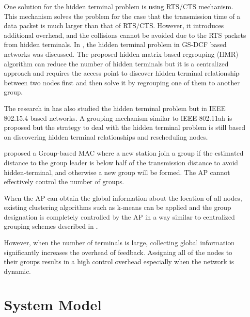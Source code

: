 One solution for the hidden terminal problem is using RTS/CTS mechanism. This mechanism solves the problem for the case that the transmission time of a data packet is much larger than that of RTS/CTS. However, it introduces additional overhead, and the collisions cannot be avoided due to the RTS packets from hidden terminals. In \cite{yoonregrouping}, the hidden terminal problem in GS-DCF based networks was discussed. The proposed hidden matrix based regrouping (HMR) algorithm can reduce the number of hidden terminals but it is a centralized approach and requires the access point to discover hidden terminal relationship between two nodes first and then solve it by regrouping one of them to another group.

The research in \cite{tseng2014effective} has also studied the hidden terminal problem but in IEEE 802.15.4-based networks. A grouping mechanism similar to IEEE 802.11ah is proposed but the strategy to deal with the hidden terminal problem is still based on discovering hidden terminal relationships and rescheduling nodes.

\cite{abichar2013group} proposed a Group-based MAC where a new station join a group if the estimated distance to the group leader is below half of the transmission distance to avoid hidden-terminal, and otherwise a new group will be formed. The AP cannot effectively control the number of groups.

When the AP can obtain the global information about the location of all nodes, existing clustering algorithms such as k-means can be applied and the group designation is completely controlled by the AP in a way similar to centralized grouping schemes described in \cite{zheng2014performance}.

However, when the number of terminals is large, collecting global information significantly increases the overhead of feedback. Assigning all of the nodes to their groups results in a high control overhead especially when the network is dynamic.


\section{System Model} \label{systemmodel}

